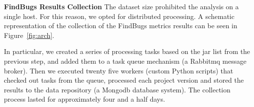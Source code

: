 \documentclass{sig-alternate}
\begin{document}



{\bf FindBugs Results Collection} The dataset
size prohibited the analysis
on a single host. For this reason,
we opted for distributed processing.
A schematic representation of the collection of
the FindBugs metrics results can be seen in Figure~\ref{fig:arch}.


In particular, we created a series of processing tasks
based on the {\sc jar} list from the
previous step, and added them to a task queue mechanism (a
Rabbit{\sc mq} message broker). Then we executed twenty five
workers (custom Python scripts) that checked out tasks from
the queue, processed each project version and stored the
results to the data repository (a Mongo{\sc db} database system).
The collection process lasted for approximately four and
a half days.
\end{document}
